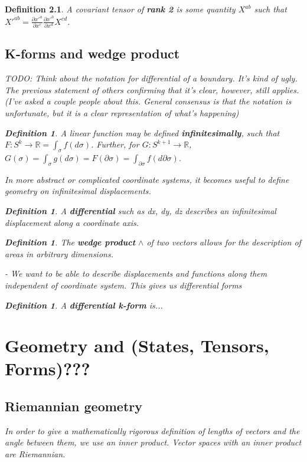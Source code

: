 \documentclass{book}
\newtheorem{defn}[equation]{Definition}
\begin{document}
\begin{defn}
	A covariant tensor of \textbf{rank 2} is some quantity $X^{ab}$ such that $X'^{ab} = \frac{\partial x'^a}{\partial x^c} \frac{\partial x'^b}{\partial x^d} X^{cd}$. 

\section{K-forms and wedge product}

TODO: Think about the notation for differential of a boundary. It's kind of ugly. The previous statement of others confirming that it's clear, however, still applies.  (\emph{I've asked a couple people about this. General consensus is that the notation is unfortunate, but it is a clear representation of what's happening})

\begin{defn}
	A linear function may be defined \textbf{infinitesimally}, such that $F : S^k \to \mathbb{R} = \int_{\sigma} f(d\sigma)$. Further, for $G : S^{k+1} \to \mathbb{R}$, $G(\sigma) = \int_{\sigma} g(d\sigma) = F(\partial\sigma) = \int_{\partial\sigma}f(d\partial\sigma)$. 
\end{defn}

In more abstract or complicated coordinate systems, it becomes useful to define geometry on infinitesimal displacements. 

\begin{defn}
	A \textbf{differential} such as dx, dy, dz describes an infinitesimal displacement along a coordinate axis. 
\end{defn}

\begin{defn}
	The \textbf{wedge product} $\wedge$ of two vectors allows for the description of areas in arbitrary dimensions. 
\end{defn}

- \emph{We want to be able to describe displacements and functions along them independent of coordinate system. This gives us differential forms}


\begin{defn}
	A \textbf{differential k-form} is...
\end{defn}


\chapter{Geometry and (States, Tensors, Forms)???}

\section{Riemannian geometry}
In order to give a mathematically rigorous definition of lengths of vectors and the angle between them, we use an inner product. Vector spaces with an inner product are Riemannian.


\end{defn}
\end{document}

